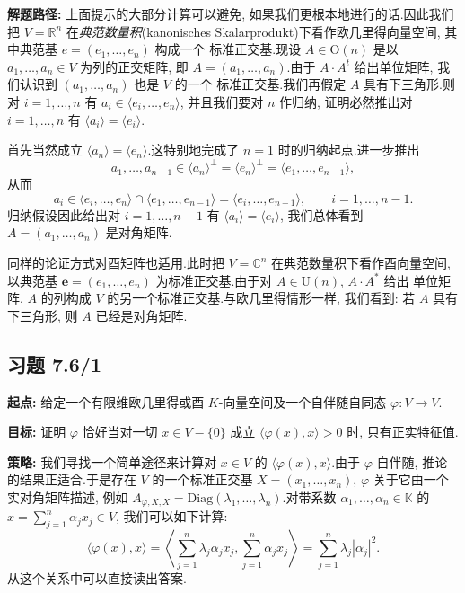 \noindent\textbf{解题路径:} 上面提示的大部分计算可以避免, 如果我们更根本地进行的话.因此我们把
$V = \mathbb{R}^n$ 在\emph{典范数量积}(\textup{kanonisches Skalarprodukt})下看作欧几里得向量空间, 其中典范基 $e = (e_1, \ldots, e_n)$ 构成一个
标准正交基.现设 $A \in \mathrm{O}(n)$ 是以 $a_1, \ldots, a_n \in V$ 为列的正交矩阵, 即
$A = (a_1, \ldots, a_n)$.由于 $A \cdot A^t$ 给出单位矩阵, 我们认识到 $(a_1, \ldots, a_n)$ 也是 $V$ 的一个
标准正交基.我们再假定 $A$ 具有下三角形.则对 $i = 1, \ldots, n$ 有
$a_i \in \langle e_i, \ldots, e_n \rangle$, 并且我们要对 $n$ 作归纳, 证明必然推出对 $i = 1, \ldots, n$
有 $\langle a_i \rangle = \langle e_i \rangle$.

首先当然成立 $\langle a_n \rangle = \langle e_n \rangle$.这特别地完成了 $n = 1$ 时的归纳起点.进一步推出
\[
a_1, \ldots, a_{n-1} \in \langle a_n \rangle^{\perp} = \langle e_n \rangle^{\perp} = \langle e_1, \ldots, e_{n-1} \rangle,
\]
从而
\[
a_i \in \langle e_i, \ldots, e_n \rangle \cap \langle e_1, \ldots, e_{n-1} \rangle = \langle e_i, \ldots, e_{n-1} \rangle, \qquad i = 1, \ldots, n - 1\text{.}
\]
归纳假设因此给出对 $i = 1, \ldots, n - 1$ 有 $\langle a_i \rangle = \langle e_i \rangle$, 我们总体看到
$A = (a_1, \ldots, a_n)$ 是对角矩阵.

同样的论证方式对酉矩阵也适用.此时把 $V = \mathbb{C}^n$ 在典范数量积下看作酉向量空间, 以典范基
$\boldsymbol{e} = (e_1, \ldots, e_n)$ 为标准正交基.由于对 $A \in \mathrm{U}(n)$, $A \cdot A^*$ 给出
单位矩阵, $A$ 的列构成 $V$ 的另一个标准正交基.与欧几里得情形一样, 我们看到: 若 $A$ 具有下三角形,
则 $A$ 已经是对角矩阵.

\subsection*{习题 7.6/1}

\noindent\textbf{起点:} 给定一个有限维欧几里得或酉 $K$-向量空间及一个自伴随自同态
$\varphi \colon V \longrightarrow V$.

\noindent\textbf{目标:} 证明 $\varphi$ 恰好当对一切 $x \in V - \{0\}$ 成立
$\langle \varphi(x), x \rangle > 0$ 时, 只有正实特征值.

\noindent\textbf{策略:} 我们寻找一个简单途径来计算对 $x \in V$ 的 $\langle \varphi(x), x \rangle$.由于
$\varphi$ 自伴随, 推论~ 的结果正适合.于是存在 $V$ 的一个标准正交基
$X = (x_1, \ldots, x_n)$, $\varphi$ 关于它由一个实对角矩阵描述, 例如
$A_{\varphi, X, X} = \mathrm{Diag}(\lambda_1, \ldots, \lambda_n)$.对带系数
$\alpha_1, \ldots, \alpha_n \in \mathbb{K}$ 的 $x = \sum_{j = 1}^{n} \alpha_j x_j \in V$, 我们可以如下计算:
\[
\langle \varphi(x), x \rangle = \left\langle \sum_{j = 1}^{n} \lambda_j \alpha_j x_j, \sum_{j = 1}^{n} \alpha_j x_j \right\rangle = \sum_{j = 1}^{n} \lambda_j |\alpha_j|^2\text{.}
\]
从这个关系中可以直接读出答案.

